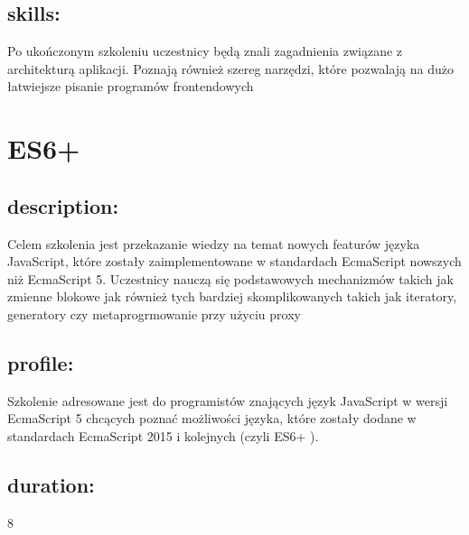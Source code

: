 \documentclass{article}[10pt]
\begin{document}
	\subsection*{skills:}
\begin{adjustwidth}{2cm}{}
	
Po ukończonym szkoleniu uczestnicy będą znali zagadnienia związane z architekturą aplikacji. Poznają również szereg narzędzi, które pozwalają na dużo łatwiejsze pisanie programów frontendowych 


\end{adjustwidth}

\newpage


    
	\section{ES6+}

	\subsection*{description:}
	\begin{adjustwidth}{2cm}{}
		
Celem szkolenia jest przekazanie wiedzy na temat nowych featurów języka JavaScript, które zostały zaimplementowane w standardach EcmaScript nowszych niż EcmaScript 5. Uczestnicy nauczą się podstawowych mechanizmów takich jak zmienne blokowe jak również tych bardziej skomplikowanych takich jak iteratory, generatory czy metaprogrmowanie przy użyciu proxy

	\end{adjustwidth}
	\subsection*{profile:}
\begin{adjustwidth}{2cm}{}
	
Szkolenie adresowane jest do programistów znających język JavaScript w wersji EcmaScript 5 chcących poznać możliwości języka, które zostały dodane w standardach EcmaScript 2015 i kolejnych (czyli ES6+ ).
\end{adjustwidth}
	\subsection*{duration:}
\begin{adjustwidth}{2cm}{}
	8
\end{adjustwidth}
\end{document}
